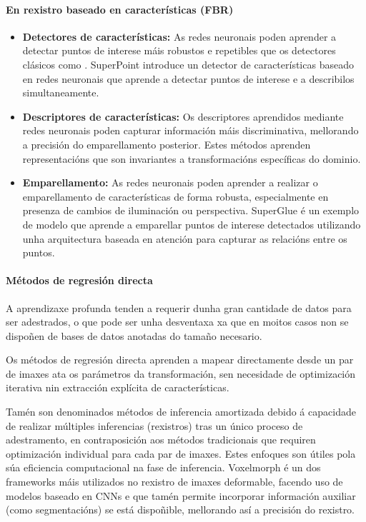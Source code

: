 \paragraph{En rexistro baseado en características (FBR)}
\label{par:FBR_substitution}

\begin{itemize}
\item \textbf{Detectores de características:} As redes neuronais poden aprender a detectar puntos de interese máis robustos e repetibles que os detectores clásicos como . SuperPoint \cite{superpoint} introduce un detector de características baseado en redes neuronais que aprende a detectar puntos de interese e a describilos simultaneamente.
\item \textbf{Descriptores de características:} Os descriptores aprendidos mediante redes neuronais poden capturar información máis discriminativa, mellorando a precisión do emparellamento posterior. Estes métodos aprenden representacións que son invariantes a transformacións específicas do dominio.
\item \textbf{Emparellamento:} As redes neuronais poden aprender a realizar o emparellamento de características de forma robusta, especialmente en presenza de cambios de iluminación ou perspectiva. SuperGlue \cite{superglue} é un exemplo de modelo que aprende a emparellar puntos de interese detectados utilizando unha arquitectura baseada en atención para capturar as relacións entre os puntos.
\end{itemize}

\paragraph{Métodos de regresión directa}
\label{par:direct_regression}

A aprendizaxe profunda tenden a requerir dunha gran cantidade de datos para ser adestrados, o que pode ser unha desventaxa xa que en moitos casos non se dispoñen de bases de datos anotadas do tamaño necesario.

Os métodos de regresión directa aprenden a mapear directamente desde un par de imaxes ata os parámetros da transformación, sen necesidade de optimización iterativa nin extracción explícita de características.

Tamén son denominados métodos de inferencia amortizada debido á capacidade de realizar múltiples inferencias (rexistros) tras un único proceso de adestramento, en contraposición aos métodos tradicionais que requiren optimización individual para cada par de imaxes.
Estes enfoques son útiles pola súa eficiencia computacional na fase de inferencia. Voxelmorph \cite{Balakrishnan_2019voxelmorph} é un dos frameworks máis utilizados no rexistro de imaxes deformable, facendo uso de modelos baseado en \gls{CNN}s e que tamén permite incorporar información auxiliar (como segmentacións) se está dispoñible, mellorando así a precisión do rexistro.

